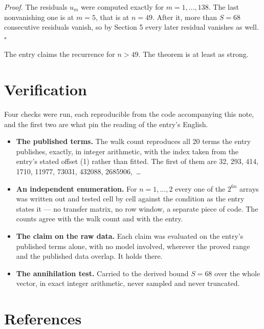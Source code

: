 \documentclass[11pt]{article}
\theoremstyle{definition}
\begin{document}
{\itshape Proof.} The residuals $u_m$ were computed exactly for $m = 1,\dots,138$. The last nonvanishing one is at $m = 5$, that is at $n = 49$. After it, more than $S = 68$ consecutive residuals vanish, so by Section 5 every later residual vanishes as well. $\square$

The entry claims the recurrence for $n > 49$. The theorem is at least as strong.

\section{Verification}

Four checks were run, each reproducible from the code accompanying this note, and the first two are what pin the reading of the entry's English.

\begin{itemize}

\item {\bfseries The published terms.} The walk count reproduces all 20 terms the entry publishes, exactly, in integer arithmetic, with the index taken from the entry's stated offset (1) rather than fitted. The first of them are 32, 293, 414, 1710, 11977, 73031, 432088, 2685906,~\dots

\item {\bfseries An independent enumeration.} For $n = 1,\dots,2$ every one of the $2^{6n}$ arrays was written out and tested cell by cell against the condition as the entry states it --- no transfer matrix, no row window, a separate piece of code. The counts agree with the walk count and with the entry.

\item {\bfseries The claim on the raw data.} Each claim was evaluated on the entry's published terms alone, with no model involved, wherever the proved range and the published data overlap. It holds there.

\item {\bfseries The annihilation test.} Carried to the derived bound $S = 68$ over the whole vector, in exact integer arithmetic, never sampled and never truncated.

\end{itemize}

\section{References}
\end{document}
